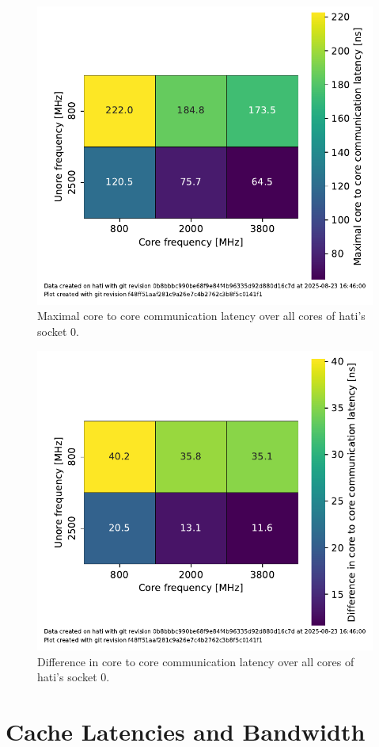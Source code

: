 \begin{figure}[]
    \centering
    \includegraphics[width=\columnwidth]{fig/core-to-core-latency/all-to-all-heatmap-max.pdf}
    \caption{Maximal core to core communication latency over all cores of hati's socket 0.}
\end{figure}
\begin{figure}[]
    \centering
    \includegraphics[width=\columnwidth]{fig/core-to-core-latency/all-to-all-heatmap-diff.pdf}
    \caption{Difference in core to core communication latency over all cores of hati's socket 0.}
\end{figure}


\section{Cache Latencies and Bandwidth}

